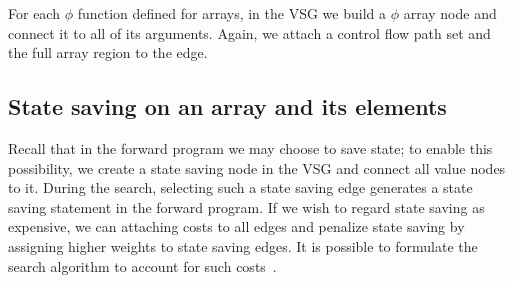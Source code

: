 

For each $\phi$ function defined for arrays, in the VSG we build a $\phi$ array node and connect it to all of its arguments. 
Again, we attach a control flow path set and the full array region to the edge.


\subsection{State saving on an array and its elements}

Recall that in the forward program we may choose to save state;
to enable this possibility, we create a state saving node in the VSG and connect all value nodes to it.
During the search, selecting such a state saving edge generates a state saving statement in the forward program.
If we wish to regard state saving as expensive, we can attaching costs to all edges and penalize state saving by assigning higher weights to state saving edges.
It is possible to formulate the search algorithm to account for such costs~\cite{Hou2012}.



